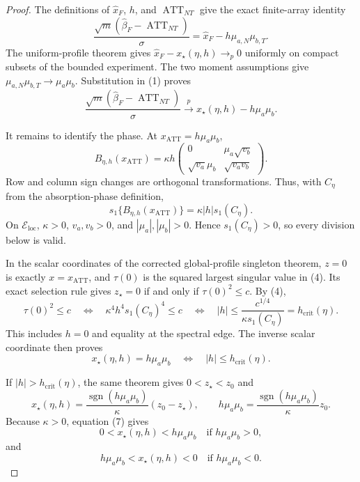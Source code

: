 \documentclass{article}
\begin{document}
\begin{proof}
The definitions of \(\widehat x_F\), \(h\), and \(\operatorname{ATT}_{NT}\) give the exact finite-array identity
\[
 \frac{\sqrt m(\widehat\beta_F-\operatorname{ATT}_{NT})}{\sigma}
 =\widehat x_F-h\mu_{a,N}\mu_{b,T}. \tag{1}
\]
The uniform-profile theorem gives
\(\widehat x_F-x_\star(\eta,h)\to_p0\) uniformly on compact subsets of the bounded experiment.  The two moment assumptions give
\(\mu_{a,N}\mu_{b,T}\to\mu_a\mu_b\).  Substitution in (1) proves
\[
 \frac{\sqrt m(\widehat\beta_F-\operatorname{ATT}_{NT})}{\sigma}
 \xrightarrow{p}x_\star(\eta,h)-h\mu_a\mu_b. \tag{2}
\]

It remains to identify the phase.  At
\(x_{\operatorname{ATT}}=h\mu_a\mu_b\),
\[
 B_{\eta,h}(x_{\operatorname{ATT}})
 =\kappa h
 \begin{pmatrix}
 0&\mu_a\sqrt{v_b}\\
 \sqrt{v_a}\mu_b&\sqrt{v_av_b}
 \end{pmatrix}. \tag{3}
\]
Row and column sign changes are orthogonal transformations.  Thus, with \(C_\eta\) from the absorption-phase definition,
\[
 s_1\{B_{\eta,h}(x_{\operatorname{ATT}})\}
 =\kappa|h|s_1(C_\eta). \tag{4}
\]
On \(\mathcal E_{\mathrm{loc}}\), \(\kappa>0\), \(v_a,v_b>0\), and \(|\mu_a|,|\mu_b|>0\).  Hence \(s_1(C_\eta)>0\), so every division below is valid.

In the scalar coordinates of the corrected global-profile singleton theorem, \(z=0\) is exactly \(x=x_{\operatorname{ATT}}\), and \(\tau(0)\) is the squared largest singular value in (4).  Its exact selection rule gives \(z_\star=0\) if and only if \(\tau(0)^2\leq c\).  By (4),
\[
 \tau(0)^2\leq c
 \quad\Longleftrightarrow\quad
 \kappa^4h^4s_1(C_\eta)^4\leq c
 \quad\Longleftrightarrow\quad
 |h|\leq\frac{c^{1/4}}{\kappa s_1(C_\eta)}
 =h_{\mathrm{crit}}(\eta). \tag{5}
\]
This includes \(h=0\) and equality at the spectral edge.  The inverse scalar coordinate then proves
\[
 x_\star(\eta,h)=h\mu_a\mu_b
 \quad\Longleftrightarrow\quad
 |h|\leq h_{\mathrm{crit}}(\eta). \tag{6}
\]

If \(|h|>h_{\mathrm{crit}}(\eta)\), the same theorem gives \(0<z_\star<z_0\) and
\[
 x_\star(\eta,h)
 =\frac{\operatorname{sgn}(h\mu_a\mu_b)}\kappa(z_0-z_\star),
 \qquad
 h\mu_a\mu_b
 =\frac{\operatorname{sgn}(h\mu_a\mu_b)}\kappa z_0. \tag{7}
\]
Because \(\kappa>0\), equation (7) gives
\[
 0<x_\star(\eta,h)<h\mu_a\mu_b
 \quad\text{if }h\mu_a\mu_b>0,
\]
and
\[
 h\mu_a\mu_b<x_\star(\eta,h)<0
 \quad\text{if }h\mu_a\mu_b<0. \tag{8}
\]


\end{proof}
\end{document}

